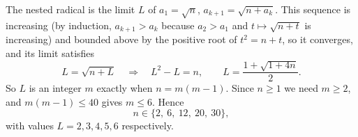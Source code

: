 The nested radical is the limit $L$ of $a_1=\sqrt n$, $a_{k+1}=\sqrt{n+a_k}$. This sequence is increasing (by induction, $a_{k+1}>a_k$ because $a_2>a_1$ and $t\mapsto\sqrt{n+t}$ is increasing) and bounded above by the positive root of $t^2=n+t$, so it converges, and its limit satisfies
\[
L=\sqrt{n+L}\quad\Longrightarrow\quad L^2-L=n,\qquad L=\dfrac{1+\sqrt{1+4n}}{2}.
\]
So $L$ is an integer $m$ exactly when $n=m(m-1)$. Since $n\ge1$ we need $m\ge2$, and $m(m-1)\le40$ gives $m\le6$. Hence
\[
n\in\{\boxed{2,\ 6,\ 12,\ 20,\ 30}\},
\]
with values $L=2,3,4,5,6$ respectively.
